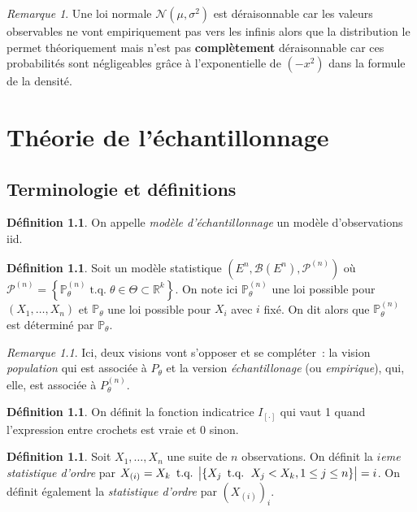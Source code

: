 \documentclass{report}
\DeclareMathOperator{\tq}{\text{ t.q. }}
\renewcommand{\P}{\mathbb P}
\newcommand{\statmod}[4]{\left(#1^{#4}, #2\left(#1^{#4}\right), #3^{\left(#4\right)}\right)}
\newcommand{\Nms}{\mathcal N(\mu, \sigma^2)}
\newcommand{\R}{\mathbb R}
\newcommand{\Brl}{\mathcal B}  %
\theoremstyle{definition}
\newtheorem{déf}[thm]{Définition}
\theoremstyle{remark}
\newtheorem*{rmq}{Remarque}
\begin{document}
	\begin{rmq} Une loi normale $\Nms$ est déraisonnable car les valeurs observables ne vont empiriquement pas vers les infinis alors que la distribution le
	permet théoriquement mais n'est pas \textbf{complètement} déraisonnable car ces probabilités sont négligeables grâce à l'exponentielle de $(-x^2)$ dans la
	formule de la densité.
	\end{rmq}

\chapter{Théorie de l'échantillonnage}
	\section{Terminologie et définitions}
		\begin{déf} On appelle \textit{modèle d'échantillonnage} un modèle d'observations iid.  \end{déf}

		\begin{déf} Soit un modèle statistique $\statmod E\Brl{\mathcal P}n$ où $\mathcal P^{(n)} =
		\left\{\P_\theta^{(n)} \tq \theta \in \Theta \subset \R^k\right\}$. On note ici $\P^{(n)}_\theta$ une loi possible pour $(X_1, \ldots, X_n)$ et $\P_\theta$
		une loi possible pour $X_i$ avec $i$ fixé. On dit alors que $\P^{(n)}_\theta$ est déterminé par $\P_\theta$.
		\end{déf}

		\begin{rmq} Ici, deux visions vont s'opposer et se compléter~: la vision \textit{population} qui est associée à $P_\theta$ et la version
		\textit{échantillonage} (ou \textit{empirique}), qui, elle, est associée à $P_\theta^{(n)}$.
		\end{rmq}

		\begin{déf} On définit la fonction indicatrice $I_{[\cdot]}$ qui vaut 1 quand l'expression entre crochets est vraie et 0 sinon. \end{déf}

		\begin{déf} Soit $X_1, \ldots, X_n$ une suite de $n$ observations. On définit la \textit{$i$eme statistique d'ordre} par
		$X_{(i)} = X_k \tq \abs {\{X_j \tq X_j < X_k, 1 \leq j \leq n\}} = i$. On définit également la \textit{statistique d'ordre} par $\left(X_{(i)}\right)_i$.
		\end{déf}
\end{document}
